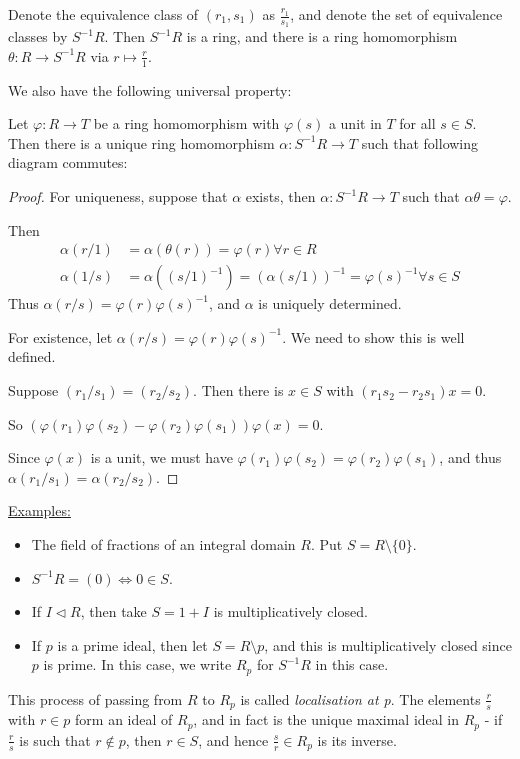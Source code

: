 \documentclass[10pt,a4paper]{article}
\begin{document}
Denote the equivalence class of $(r_1, s_1)$ as $\frac{r_1}{s_1}$, and denote the set of equivalence classes by $S^{-1}R$. Then $S^{-1}R$ is a ring, and there is a ring homomorphism $\theta : R \to S^{-1}R$ via $r \mapsto \frac{r}{1}$.

We also have the following universal property:
\begin{lemma}
  Let $\varphi:R \to T$ be a ring homomorphism with $\varphi(s)$ a unit in $T$ for all $s \in S$. Then there is a unique ring homomorphism $\alpha : S^{-1}R \to T$ such that following diagram commutes:
  \begin{center}
  \end{center}
\end{lemma}
\begin{proof}
  For uniqueness, suppose that $\alpha$ exists, then $\alpha:S^{-1}R \to T$ such that $\alpha\theta = \varphi$.

  Then
  \begin{align*}
    \alpha(r/1) &= \alpha(\theta(r)) = \varphi(r) \forall r\in R\\
    \alpha(1/s) &= \alpha((s/1)^{-1}) = (\alpha(s/1))^{-1} = \varphi(s)^{-1} \forall s \in S
  \end{align*}
  Thus $\alpha(r/s) = \varphi(r)\varphi(s)^{-1}$, and $\alpha$ is uniquely determined.

  For existence, let $\alpha(r/s) = \varphi(r)\varphi(s)^{-1}$. We need to show this is well defined.

  Suppose $(r_1/s_1) = (r_2/s_2)$. Then there is $x \in S$ with $(r_1s_2-r_2s_1)x = 0$.

  So $(\varphi(r_1)\varphi(s_2)-\varphi(r_2)\varphi(s_1))\varphi(x) = 0$.

  Since $\varphi(x)$ is a unit, we must have $\varphi(r_1)\varphi(s_2) = \varphi(r_2)\varphi(s_1)$, and thus $\alpha(r_1/s_1) = \alpha(r_2/s_2)$.
\end{proof}
\underline{Examples:}
\begin{itemize}
  \item The field of fractions of an integral domain $R$. Put $S = R\setminus\{0\}$.
  \item $S^{-1}R = (0) \iff 0 \in S$.
  \item If $I \triangleleft R$, then take $S = 1+I$ is multiplicatively closed.
  \item If $p$ is a prime ideal, then let $S = R\setminus p$, and this is multiplicatively closed since $p$ is prime. In this case, we write $R_p$ for $S^{-1}R$ in this case.
\end{itemize}
This process of passing from $R$ to $R_p$ is called \emph{localisation at p}. The elements $\frac{r}{s}$ with $r \in p$ form an ideal of $R_p$, and in fact is the unique maximal ideal in $R_p$ - if $\frac{r}{s}$ is such that $r \notin p$, then $r \in S$, and hence $\frac{s}{r}\in R_p$ is its inverse.
\end{document}
